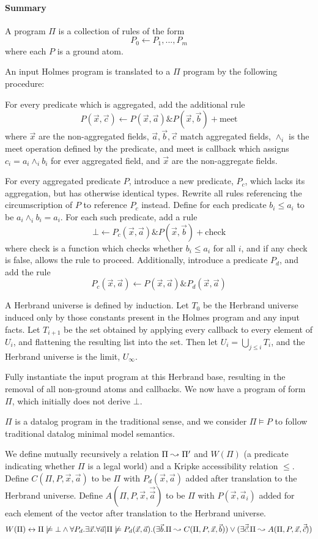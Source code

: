 \paragraph{Summary} 
A program $\Pi$ is a collection of rules of the form
\[
	P_0 \leftarrow P_1, ..., P_m
\]
where each $P$ is a ground atom.

An input Holmes program is translated to a $\Pi$ program by the following procedure:

For every predicate which is aggregated, add the additional rule
\[
	P(\vec{x}, \vec{c}) \leftarrow P(\vec{x}, \vec{a}) \& P(\vec{x}, \vec{b}) + \textrm{meet}
\]
where $\vec{x}$ are the non-aggregated fields, $\vec{a}, \vec{b}, \vec{c}$ match aggregated fields, $\wedge_i$ is the meet operation defined by the predicate, and meet is callback which assigns $c_i = a_i \wedge_i b_i$ for ever aggregated field, and $\vec{x}$ are the non-aggregate fields.

For every aggregated predicate $P$, introduce a new predicate, $P_c$, which lacks its aggregation, but has otherwise identical types.
Rewrite all rules referencing the circumscription of $P$ to reference $P_c$ instead.
Define for each predicate $b_i \leq a_i$ to be $a_i \wedge_i b_i = a_i$.
For each such predicate, add a rule
\[
	\bot \leftarrow P_c(\vec{x}, \vec{a}) \& P(\vec{x}, \vec{b}) + \textrm{check}
\]
where check is a function which checks whether $b_i \leq a_i$ for all $i$, and if any check is false, allows the rule to proceed.
Additionally, introduce a predicate $P_d$, and add the rule
\[
	P_c(\vec{x}, \vec{a}) \leftarrow P(\vec{x}, \vec{a}) \& P_d(\vec{x}, \vec{a})
\]

A Herbrand universe is defined by induction.
Let $T_0$ be the Herbrand universe induced only by those constants present in the Holmes program and any input facts.
Let $T_{i + 1}$ be the set obtained by applying every callback to every element of $U_i$, and flattening the resulting list into the set.
Then let $U_i = \bigcup_{j \leq i} T_i$, and the Herbrand universe is the limit, $U_\infty$.

Fully instantiate the input program at this Herbrand base, resulting in the removal of all non-ground atoms and callbacks.
We now have a program of form $\Pi$, which initially does not derive $\bot$.

$\Pi$ is a datalog program in the traditional sense, and we consider $\Pi \models P$ to follow traditional datalog minimal model semantics. 

We define mutually recursively a relation $\Pi \leadsto \Pi'$ and $W(\Pi)$ (a predicate indicating whether $\Pi$ is a legal world) and a Kripke accessibility relation $\leq$.
Define $C(\Pi, P, \vec{x}, \vec{a})$ to be $\Pi$ with $P_d(\vec{x}, \vec{a})$ added after translation to the Herbrand universe.
Define $A(\Pi, P, \vec{x}, \vec{\vec{a}})$ to be $\Pi$ with $P(\vec{x}, \vec{a}_i)$ added for each element of the vector after translation to the Herbrand universe.
\[
	W(\Pi) \leftrightarrow \Pi \not \models \bot \wedge \forall P_d. \exists \vec{x}. \forall \vec{a} | \Pi \not \models P_d(\vec{x}, \vec{a}). (\exists \vec{b}. \Pi \leadsto C(\Pi, P, \vec{x}, \vec{b})) \vee (\exists \vec{\vec{c}}. \Pi \leadsto A(\Pi, P, \vec{x}, \vec{\vec{c}}))
\]

